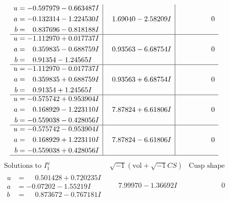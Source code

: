 \documentclass[1p]{elsarticle_modified}
\theoremstyle{definition}
\newcommand{\I}{\sqrt{-1}}
\begin{document}
$$\begin{array}{c|c|c}
\begin{aligned}
u &= -0.597979 - 0.663487 I \\
a &= -0.132314 - 1.224530 I \\
b &= \phantom{-}0.837696 - 0.818188 I\end{aligned}
 & \phantom{-}1.69040 - 2.58209 I & \phantom{-0.000000 } 0 \\ \hline\begin{aligned}
u &= -1.112970 + 0.017737 I \\
a &= \phantom{-}0.359835 - 0.688759 I \\
b &= \phantom{-}0.91354 - 1.24565 I\end{aligned}
 & \phantom{-}0.93563 - 6.68754 I & \phantom{-0.000000 } 0 \\ \hline\begin{aligned}
u &= -1.112970 - 0.017737 I \\
a &= \phantom{-}0.359835 + 0.688759 I \\
b &= \phantom{-}0.91354 + 1.24565 I\end{aligned}
 & \phantom{-}0.93563 + 6.68754 I & \phantom{-0.000000 } 0 \\ \hline\begin{aligned}
u &= -0.575742 + 0.953904 I \\
a &= \phantom{-}0.168929 - 1.223110 I \\
b &= -0.559038 - 0.428056 I\end{aligned}
 & \phantom{-}7.87824 + 6.61806 I & \phantom{-0.000000 } 0 \\ \hline\begin{aligned}
u &= -0.575742 - 0.953904 I \\
a &= \phantom{-}0.168929 + 1.223110 I \\
b &= -0.559038 + 0.428056 I\end{aligned}
 & \phantom{-}7.87824 - 6.61806 I & \phantom{-0.000000 } 0\\
 \hline 
 \end{array}$$\newpage$$\begin{array}{c|c|c}  
\text{Solutions to }I^u_{1}& \I (\text{vol} + \sqrt{-1}CS) & \text{Cusp shape}\\
 \hline 
\begin{aligned}
u &= \phantom{-}0.501428 + 0.720235 I \\
a &= -0.07202 - 1.55219 I \\
b &= \phantom{-}0.873672 - 0.767181 I\end{aligned}
 & \phantom{-}7.99970 - 1.36692 I & \phantom{-0.000000 } 0 \\ \hline\begin{aligned}

\end{aligned}
\end{array}$$
\end{document}
